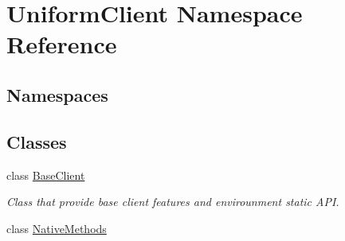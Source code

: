 \hypertarget{namespace_uniform_client}{}\section{Uniform\+Client Namespace Reference}
\label{namespace_uniform_client}
\subsection*{Namespaces}
\begin{DoxyCompactItemize}
\end{DoxyCompactItemize}
\subsection*{Classes}
\begin{DoxyCompactItemize}
\item 
class \mbox{\hyperlink{class_uniform_client_1_1_base_client}{Base\+Client}}
\begin{DoxyCompactList}\small\item\em Class that provide base client features and envirounment static A\+PI. \end{DoxyCompactList}\item 
class \mbox{\hyperlink{class_uniform_client_1_1_native_methods}{Native\+Methods}}
\end{DoxyCompactItemize}
